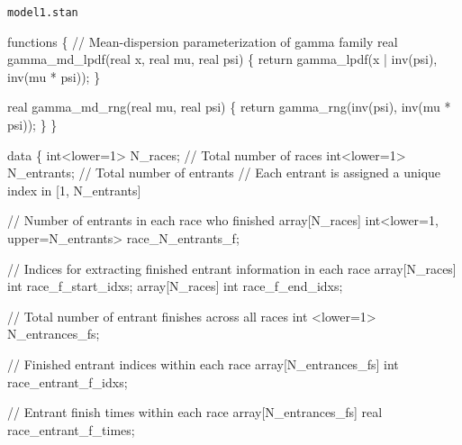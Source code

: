 \documentclass[
  letterpaper,
  DIV=11,
  numbers=noendperiod]{scrartcl}
\newenvironment{Shaded}{\begin{snugshade}}{\end{snugshade}}
\newcommand{\CommentTok}[1]{\textcolor[rgb]{0.37,0.37,0.37}{#1}}
\newcommand{\ControlFlowTok}[1]{\textcolor[rgb]{0.00,0.23,0.31}{#1}}
\newcommand{\DataTypeTok}[1]{\textcolor[rgb]{0.68,0.00,0.00}{#1}}
\newcommand{\DecValTok}[1]{\textcolor[rgb]{0.68,0.00,0.00}{#1}}
\newcommand{\KeywordTok}[1]{\textcolor[rgb]{0.00,0.23,0.31}{#1}}
\newcommand{\NormalTok}[1]{\textcolor[rgb]{0.00,0.23,0.31}{#1}}
\begin{document}
\begin{codelisting}

\caption{\texttt{model1.stan}}

\begin{Shaded}
\begin{Highlighting}[]
\KeywordTok{functions}\NormalTok{ \{}
  \CommentTok{// Mean{-}dispersion parameterization of gamma family}
  \DataTypeTok{real}\NormalTok{ gamma\_md\_lpdf(}\DataTypeTok{real}\NormalTok{ x, }\DataTypeTok{real}\NormalTok{ mu, }\DataTypeTok{real}\NormalTok{ psi) \{}
    \ControlFlowTok{return}\NormalTok{ gamma\_lpdf(x | inv(psi), inv(mu * psi));}
\NormalTok{  \}}

  \DataTypeTok{real}\NormalTok{ gamma\_md\_rng(}\DataTypeTok{real}\NormalTok{ mu, }\DataTypeTok{real}\NormalTok{ psi) \{}
    \ControlFlowTok{return}\NormalTok{ gamma\_rng(inv(psi), inv(mu * psi));}
\NormalTok{  \}}
\NormalTok{\}}

\KeywordTok{data}\NormalTok{ \{}
  \DataTypeTok{int}\NormalTok{\textless{}}\KeywordTok{lower}\NormalTok{=}\DecValTok{1}\NormalTok{\textgreater{} N\_races;    }\CommentTok{// Total number of races}
  \DataTypeTok{int}\NormalTok{\textless{}}\KeywordTok{lower}\NormalTok{=}\DecValTok{1}\NormalTok{\textgreater{} N\_entrants; }\CommentTok{// Total number of entrants}
  \CommentTok{// Each entrant is assigned a unique index in [1, N\_entrants]}

  \CommentTok{// Number of entrants in each race who finished}
  \DataTypeTok{array}\NormalTok{[N\_races] }\DataTypeTok{int}\NormalTok{\textless{}}\KeywordTok{lower}\NormalTok{=}\DecValTok{1}\NormalTok{, }\KeywordTok{upper}\NormalTok{=N\_entrants\textgreater{} race\_N\_entrants\_f;}

  \CommentTok{// Indices for extracting finished entrant information in each race}
  \DataTypeTok{array}\NormalTok{[N\_races] }\DataTypeTok{int}\NormalTok{ race\_f\_start\_idxs;}
  \DataTypeTok{array}\NormalTok{[N\_races] }\DataTypeTok{int}\NormalTok{ race\_f\_end\_idxs;}

  \CommentTok{// Total number of entrant finishes across all races}
  \DataTypeTok{int}\NormalTok{ \textless{}}\KeywordTok{lower}\NormalTok{=}\DecValTok{1}\NormalTok{\textgreater{} N\_entrances\_fs;}

  \CommentTok{// Finished entrant indices within each race}
  \DataTypeTok{array}\NormalTok{[N\_entrances\_fs] }\DataTypeTok{int}\NormalTok{ race\_entrant\_f\_idxs;}

  \CommentTok{// Entrant finish times within each race}
  \DataTypeTok{array}\NormalTok{[N\_entrances\_fs] }\DataTypeTok{real}\NormalTok{ race\_entrant\_f\_times;}


\end{Highlighting}
\end{Shaded}
\end{codelisting}
\end{document}
